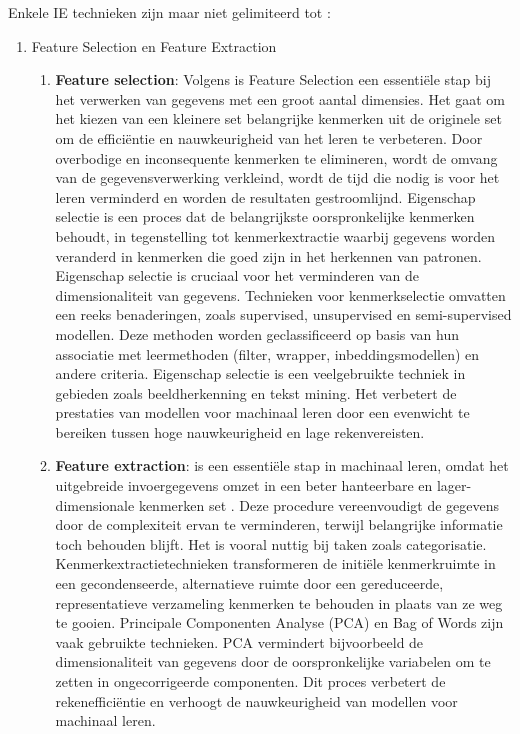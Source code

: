 Enkele IE technieken zijn maar niet gelimiteerd tot \autocite{IBM2024}:
\begin{enumerate}
    \item Feature Selection en Feature Extraction
    \begin{enumerate}
        \item \textbf{Feature selection}: Volgens  \textcite{CAI201870} is Feature Selection een essentiële stap bij het verwerken van gegevens met een groot aantal dimensies. Het gaat om het kiezen van een kleinere set belangrijke kenmerken uit de originele set om de efficiëntie en nauwkeurigheid van het leren te verbeteren. Door overbodige en inconsequente kenmerken te elimineren, wordt de omvang van de gegevensverwerking verkleind, wordt de tijd die nodig is voor het leren verminderd en worden de resultaten gestroomlijnd. Eigenschap selectie is een proces dat de belangrijkste oorspronkelijke kenmerken behoudt, in tegenstelling tot kenmerkextractie waarbij gegevens worden veranderd in kenmerken die goed zijn in het herkennen van patronen. Eigenschap selectie is cruciaal voor het verminderen van de dimensionaliteit van gegevens. Technieken voor kenmerkselectie omvatten een reeks benaderingen, zoals supervised, unsupervised en semi-supervised modellen. Deze methoden worden geclassificeerd op basis van hun associatie met leermethoden (filter, wrapper, inbeddingsmodellen) en andere criteria. Eigenschap selectie is een veelgebruikte techniek in gebieden zoals beeldherkenning en tekst mining. Het verbetert de prestaties van modellen voor machinaal leren door een evenwicht te bereiken tussen hoge nauwkeurigheid en lage rekenvereisten.
        \item \textbf{Feature extraction}: is een essentiële stap in machinaal leren, omdat het uitgebreide invoergegevens omzet in een beter hanteerbare en lager-dimensionale kenmerken set \autocite{Mustazzihim}. Deze procedure vereenvoudigt de gegevens door de complexiteit ervan te verminderen, terwijl belangrijke informatie toch behouden blijft. Het is vooral nuttig bij taken zoals categorisatie. Kenmerkextractietechnieken transformeren de initiële kenmerkruimte in een gecondenseerde, alternatieve ruimte door een gereduceerde, representatieve verzameling kenmerken te behouden in plaats van ze weg te gooien. Principale Componenten Analyse (PCA) en Bag of Words zijn vaak gebruikte technieken. PCA vermindert bijvoorbeeld de dimensionaliteit van gegevens door de oorspronkelijke variabelen om te zetten in ongecorrigeerde componenten. Dit proces verbetert de rekenefficiëntie en verhoogt de nauwkeurigheid van modellen voor machinaal leren.

\end{enumerate}
\end{enumerate}

